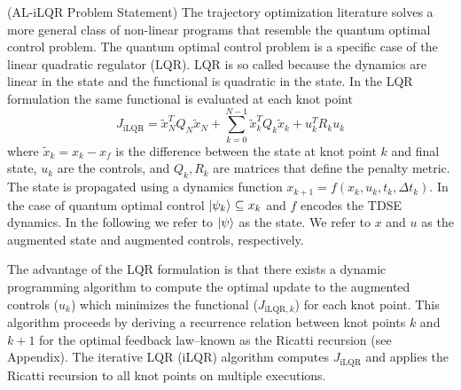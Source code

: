 \documentclass[
  amsfonts,
  amsmath,
  tbtags,
  amssymb,
  aps,
  nobibnotes,
  twocolumn,
]{revtex4-2}
\begin{document}
(AL-iLQR Problem Statement) The trajectory optimization
literature solves a more general class of non-linear programs that resemble
the quantum optimal control problem. The quantum optimal control
problem is a specific case of the linear quadratic regulator (LQR).
LQR is so called because the dynamics are linear in the state and
the functional is quadratic in the state. In the LQR formulation
the same functional is evaluated at each knot point
\begin{equation}
  J_{\textrm{iLQR}} = \tilde{x}_{N}^{T} Q_{N} \tilde{x}_{N}
  + \sum_{k = 0}^{N - 1} \tilde{x}_{k}^{T} Q_{k} \tilde{x}_{k} + u_{k}^{T} R_{k} u_{k}
\end{equation}
where $\tilde{x}_{k} = x_{k} - x_{f}$ is the difference between the state
at knot point $k$ and final state, $u_{k}$ are the controls,
and $Q_{k}, R_{k}$ are matrices that define the penalty metric.
The state is propagated using a dynamics function
$x_{k + 1} = f(x_{k}, u_{k}, t_{k}, \Delta t_{k})$.
In the case of quantum optimal control $\ket{\psi_{k}} \subseteq x_{k}$
and $f$ encodes the TDSE dynamics. In the following
we refer to $\ket{\psi}$ as the state. We refer to $x$ and $u$ as
the augmented state and augmented controls, respectively.

The advantage of the LQR formulation
is that there exists a dynamic programming algorithm to compute the
optimal update to the augmented controls ($u_{k}$) which minimizes the functional
($J_{\textrm{iLQR}, k}$) for each knot point. This algorithm proceeds by deriving a
recurrence relation between knot points $k$ and $k + 1$ for the optimal
feedback law--known as the Ricatti recursion (see Appendix). The
iterative LQR (iLQR) algorithm computes $J_{\textrm{iLQR}}$
and applies the Ricatti recursion to all knot points on multiple
executions.
\end{document}
